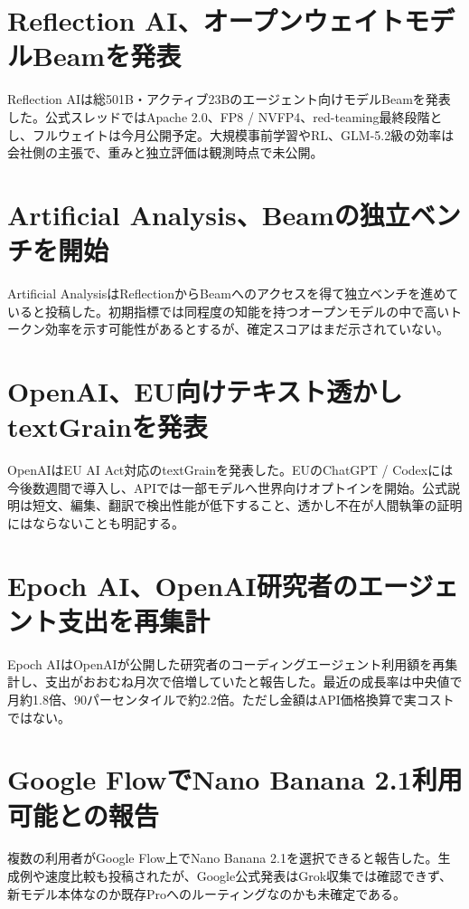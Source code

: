 \section{Reflection AI、オープンウェイトモデルBeamを発表}
Reflection AIは総501B・アクティブ23Bのエージェント向けモデルBeamを発表した。公式スレッドではApache 2.0、FP8 / NVFP4、red-teaming最終段階とし、フルウェイトは今月公開予定。大規模事前学習やRL、GLM-5.2級の効率は会社側の主張で、重みと独立評価は観測時点で未公開。

\section{Artificial Analysis、Beamの独立ベンチを開始}
Artificial AnalysisはReflectionからBeamへのアクセスを得て独立ベンチを進めていると投稿した。初期指標では同程度の知能を持つオープンモデルの中で高いトークン効率を示す可能性があるとするが、確定スコアはまだ示されていない。

\section{OpenAI、EU向けテキスト透かしtextGrainを発表}
OpenAIはEU AI Act対応のtextGrainを発表した。EUのChatGPT / Codexには今後数週間で導入し、APIでは一部モデルへ世界向けオプトインを開始。公式説明は短文、編集、翻訳で検出性能が低下すること、透かし不在が人間執筆の証明にはならないことも明記する。

\section{Epoch AI、OpenAI研究者のエージェント支出を再集計}
Epoch AIはOpenAIが公開した研究者のコーディングエージェント利用額を再集計し、支出がおおむね月次で倍増していたと報告した。最近の成長率は中央値で月約1.8倍、90パーセンタイルで約2.2倍。ただし金額はAPI価格換算で実コストではない。

\section{Google FlowでNano Banana 2.1利用可能との報告}
複数の利用者がGoogle Flow上でNano Banana 2.1を選択できると報告した。生成例や速度比較も投稿されたが、Google公式発表はGrok収集では確認できず、新モデル本体なのか既存Proへのルーティングなのかも未確定である。

